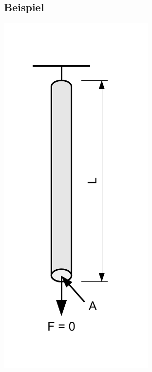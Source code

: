 \documentclass[a4paper]{scrartcl}
\begin{document}
\subsection{Beispiel}

\begin{minipage}{3cm}
\includegraphics[scale=0.6]{images/elasticity_robe.pdf}
\end{minipage}
\hfill
\end{document}
